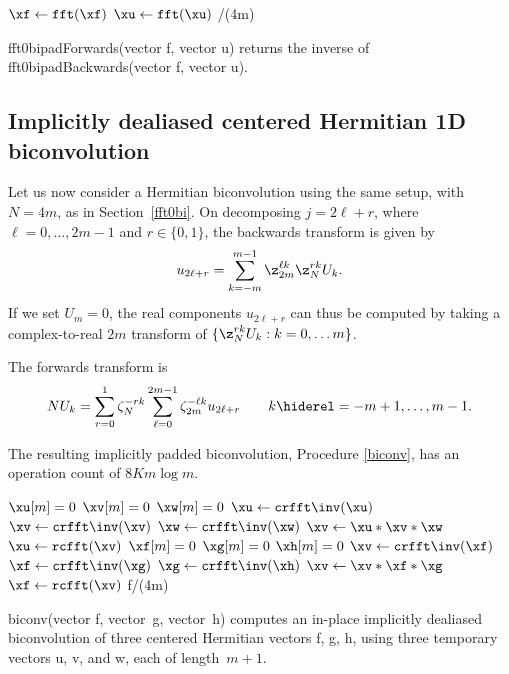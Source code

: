 \documentclass[final]{siamltex}
\def\be{\begin{dmath*}}
\def\ee{\end{dmath*}}
\def\bec{\begin{dmath*}[compact]}
\let\eec\ee
\def\no{\hiderel}
\begin{document}
\begin{function}[htbp]
  $\xf \leftarrow \fft(\xf)$\;
  $\xu \leftarrow \fft(\xu)$\;
  \Return \xf/(4m)\;
  \caption{fft0bipadForwards(vector {\sf f}, vector {\sf u}) returns the
inverse of fft0bipadBackwards(vector {\sf f}, vector {\sf u}).}
\label{fft0bipadForwards}
\end{function}

\subsection{Implicitly dealiased centered Hermitian 1D biconvolution}
Let us now consider a Hermitian biconvolution using the same setup, with
$N=4m$, as in Section~\ref{fft0bi}. On decomposing $j=2\ell+r$, where
$\ell=0,\ldots, 2m-1$ and $r\in\{0,1\}$, the backwards transform is given
by
\bec
u_{2\ell +r}=\sum_{k=-m}^{m-1} \z_{2m}^{\ell k} \z_N^{rk} U_k.
\eec
If we set $U_m=0$, the real components $u_{2\ell +r}$ can thus be computed
by taking a complex-to-real $2m$ transform of
$\{\z_N^{rk} U_k : k=0,\ldots m\}$.

The forwards transform is
\be
NU_k=\sum_{r=0}^{1}\zeta_N^{-rk}
\sum_{\ell=0}^{2m-1} \zeta_{2m}^{-\ell k} u_{2\ell+r}
\qquad k\no =-m+1,\ldots,m-1.
\ee

The resulting implicitly padded biconvolution, Procedure \ref{biconv}, has
an operation count of $8Km\log m$. 

\begin{function}[htbp]
  \medskip
  $\xu[m]=0$\;
  $\xv[m]=0$\;
  $\xw[m]=0$\;
  $\xu \leftarrow \crfft\inv(\xu)$\;
  $\xv \leftarrow \crfft\inv(\xv)$\;
  $\xw \leftarrow \crfft\inv(\xw)$\;
  $\xv \leftarrow \xu * \xv * \xw$\;
  $\xu \leftarrow \rcfft(\xv)$\;
  \medskip
  $\xf[m]=0$\;
  $\xg[m]=0$\;
  $\xh[m]=0$\;
  $\xv \leftarrow \crfft\inv(\xf)$\;
  $\xf \leftarrow \crfft\inv(\xg)$\;
  $\xg \leftarrow \crfft\inv(\xh)$\;
  $\xv \leftarrow \xv * \xf * \xg$\;
  $\xf \leftarrow \rcfft(\xv)$\;
  \medskip
  \Return f/(4m)\;
\caption{biconv(vector {\sf f}, vector~{\sf g}, vector~{\sf h}) computes
an in-place implicitly dealiased biconvolution of three centered
Hermitian vectors {\sf f}, {\sf g}, {\sf h}, using three temporary vectors
{\sf u}, {\sf v}, and {\sf w}, each of length~$m+1$.}\label{biconv}
\end{function}
\end{document}

